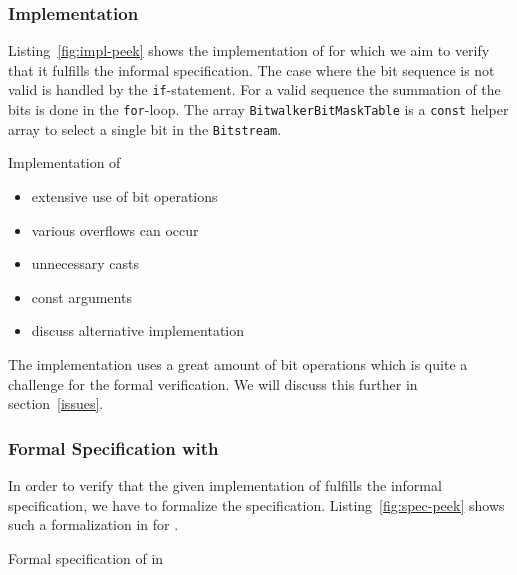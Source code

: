 \subsubsection{Implementation}
\label{impl-peek}
 
Listing~\ref{fig:impl-peek} shows the \isoc implementation of \peek 
for which we aim to verify that it fulfills the informal specification.
The case where the bit sequence is not valid is handled by the \texttt{if}-statement.
For a valid sequence the summation of the bits is done in the \texttt{for}-loop.
The array \texttt{BitwalkerBitMaskTable} is a \texttt{const} helper array 
to select a single bit in the \texttt{Bitstream}.

\begin{listing}[hbt]
\begin{minipage}{\textwidth}

\end{minipage}
\caption{\label{fig:impl-peek} Implementation of \peek}
\end{listing}

\begin{itemize}
\item extensive use of bit operations
\item various overflows can occur
\item unnecessary casts
\item const arguments
\item discuss alternative implementation
\end{itemize}

The implementation uses a great amount of bit operations
which is quite a challenge for the formal verification.
We will discuss this further in section~\ref{issues}.

\clearpage

\subsubsection{Formal Specification with \acsl}
\label{formal-peek}

In order to verify that the given implementation of \peek fulfills 
the informal specification, we have to formalize the specification.
Listing~\ref{fig:spec-peek} shows such a formalization in \acsl for \peek.

\begin{listing}[hbt]
\begin{minipage}{\textwidth}

\end{minipage}
\caption{\label{fig:spec-peek} Formal specification of \peek in \acsl}
\end{listing}

